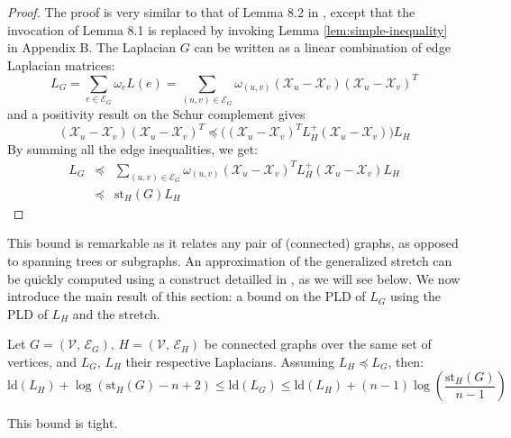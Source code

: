 \begin{proof}
The proof is very similar to that of Lemma 8.2 in \cite{Spielman2009b},
except that the invocation of Lemma 8.1 is replaced by invoking Lemma
\ref{lem:simple-inequality} in Appendix B. The Laplacian $G$ can
be written as a linear combination of edge Laplacian matrices: 
\[
L_{G}=\sum_{e\in\mathcal{E}_{G}}\omega_{e}L\left(e\right)=\sum_{\left(u,v\right)\in\mathcal{E}_{G}}\omega_{\left(u,v\right)}\left(\mathcal{X}_{u}-\mathcal{X}_{v}\right)\left(\mathcal{X}_{u}-\mathcal{X}_{v}\right)^{T}
\]
and a positivity result on the Schur complement gives%
\[
\left(\mathcal{X}_{u}-\mathcal{X}_{v}\right)\left(\mathcal{X}_{u}-\mathcal{X}_{v}\right)^{T}\preceq\Big(\left(\mathcal{X}_{u}-\mathcal{X}_{v}\right)^{T}L_{H}^{+}\left(\mathcal{X}_{u}-\mathcal{X}_{v}\right)\Big)L_{H}
\]
By summing all the edge inequalities, we get: 
\begin{eqnarray*}
L_{G} & \preceq & \sum_{\left(u,v\right)\in\mathcal{E}_{G}}\omega_{\left(u,v\right)}\left(\mathcal{X}_{u}-\mathcal{X}_{v}\right)^{T}L_{H}^{+}\left(\mathcal{X}_{u}-\mathcal{X}_{v}\right)L_{H}\\
 & \preceq & \text{st}_{H}\left(G\right)L_{H}
\end{eqnarray*}

\end{proof}
This bound is remarkable as it relates any pair of (connected) graphs,
as opposed to spanning trees or subgraphs. An approximation of the
generalized stretch can be quickly computed using a construct detailled
in \cite{Spielman2009}, as we will see below. We now introduce the
main result of this section: a bound on the PLD of $L_{G}$ using
the PLD of $L_{H}$ and the stretch.
\begin{theorem}
\label{thm:stretch-pld-bounds}Let $G=\left(\mathcal{V},\,\mathcal{E}_{G}\right),\, H=\left(\mathcal{V},\,\mathcal{E}_{H}\right)$
be connected graphs over the same set of vertices, and $L_{G}$, $L_{H}$
their respective Laplacians. Assuming $L_{H}\preceq L_{G}$, then:
\begin{equation}
\text{ld}\left(L_{H}\right)+\log\left(\text{st}_{H}\left(G\right)-n+2\right)\leq\text{ld}\left(L_{G}\right)\leq\text{ld}\left(L_{H}\right)+\left(n-1\right)\log\left(\frac{\text{st}_{H}\left(G\right)}{n-1}\right)\label{eq:encadrement-1}
\end{equation}


This bound is tight.\end{theorem}
